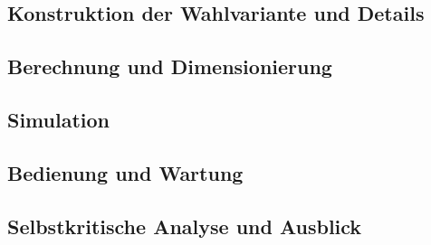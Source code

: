 \documentclass[a4paper,12pt]{scrartcl}
\begin{document}
\subsection{Konstruktion der Wahlvariante und Details}
\subsection{Berechnung und Dimensionierung}
\subsection{Simulation}
\subsection{Bedienung und Wartung}
\subsection{Selbstkritische Analyse und Ausblick}
\end{document}
